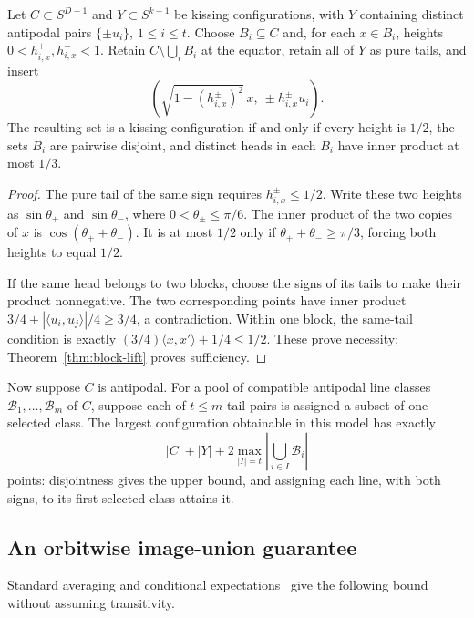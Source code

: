 \begin{proposition}\label{prop:paired-rigidity}
Let $C\subset S^{D-1}$ and $Y\subset S^{k-1}$ be kissing
configurations, with $Y$ containing distinct antipodal pairs
$\{\pm u_i\}$, $1\le i\le t$. Choose $B_i\subseteq C$ and, for
each $x\in B_i$, heights $0<h_{i,x}^+,h_{i,x}^-<1$. Retain
$C\setminus\bigcup_iB_i$ at the equator, retain all of $Y$ as pure
tails, and insert
\[
 \left(\sqrt{1-(h_{i,x}^{\pm})^2}\,x,
                         \ \pm h_{i,x}^{\pm}u_i\right).
\]
The resulting set is a kissing configuration if and only if every
height is $1/2$, the sets $B_i$ are pairwise disjoint, and distinct
heads in each $B_i$ have inner product at most $1/3$.
\end{proposition}
\begin{proof}
The pure tail of the same sign requires $h_{i,x}^{\pm}\le1/2$.
Write these two heights as $\sin\theta_+$ and $\sin\theta_-$,
where $0<\theta_{\pm}\le\pi/6$. The inner product of the two
copies of $x$ is $\cos(\theta_++\theta_-)$. It is at most $1/2$
only if $\theta_++\theta_-\ge\pi/3$, forcing both heights to
equal $1/2$.

If the same head belongs to two blocks, choose the signs of its tails
to make their product nonnegative. The two corresponding points have
inner product $3/4+|\langle u_i,u_j\rangle|/4\ge3/4$, a
contradiction. Within one block, the same-tail condition is exactly
$(3/4)\langle x,x'\rangle+1/4\le1/2$. These prove necessity;
Theorem~\ref{thm:block-lift} proves sufficiency.
\end{proof}

Now suppose $C$ is antipodal. For a pool
of compatible antipodal line classes $\mathcal B_1,\ldots,\mathcal B_m$ of $C$,
suppose each of $t\le m$ tail pairs is assigned a subset of one selected
class. The largest configuration obtainable in this model has exactly
\begin{equation}\label{eq:pool-optimum}
 |C|+|Y|+2\max_{|I|=t}\left|\bigcup_{i\in I}\mathcal B_i\right|
\end{equation}
points: disjointness gives the upper bound, and assigning each line,
with both signs, to its first selected class attains it.

\subsection{An orbitwise image-union guarantee}
Standard averaging and conditional expectations~\cite{raghavan1988}
give the following bound without assuming transitivity.

